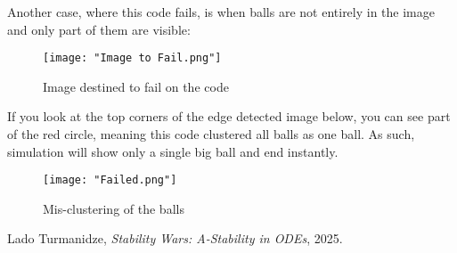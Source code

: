 \documentclass{article}
\begin{document}
	Another case, where this code fails, is when balls are not entirely in the image and only part of them are visible:
	
	\begin{figure}[H]
		\centering
		\texttt{[image: "Image to Fail.png"]}
		\caption{Image destined to fail on the code}
	\end{figure}

	If you look at the top corners of the edge detected image below, you can see part of the red circle, meaning this code clustered all balls as one ball. As such, simulation will show only a single big ball and end instantly.

	\begin{figure}[H]
		\centering
		\texttt{[image: "Failed.png"]}
		\caption{Mis-clustering of the balls}
	\end{figure}

	\begin{thebibliography}{1}	
		Lado Turmanidze,
		\textit{Stability Wars: A-Stability in ODEs},
		2025.
	\end{thebibliography}
		
	
\end{document}

